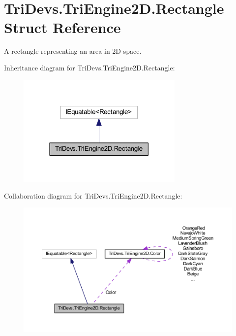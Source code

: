 \hypertarget{struct_tri_devs_1_1_tri_engine2_d_1_1_rectangle}{\section{Tri\-Devs.\-Tri\-Engine2\-D.\-Rectangle Struct Reference}
\label{struct_tri_devs_1_1_tri_engine2_d_1_1_rectangle}
}


A rectangle representing an area in 2\-D space.  




Inheritance diagram for Tri\-Devs.\-Tri\-Engine2\-D.\-Rectangle\-:\nopagebreak
\begin{figure}[H]
\begin{center}
\leavevmode
\includegraphics[width=230pt]{struct_tri_devs_1_1_tri_engine2_d_1_1_rectangle__inherit__graph}
\end{center}
\end{figure}


Collaboration diagram for Tri\-Devs.\-Tri\-Engine2\-D.\-Rectangle\-:\nopagebreak
\begin{figure}[H]
\begin{center}
\leavevmode
\includegraphics[width=350pt]{struct_tri_devs_1_1_tri_engine2_d_1_1_rectangle__coll__graph}
\end{center}
\end{figure}
